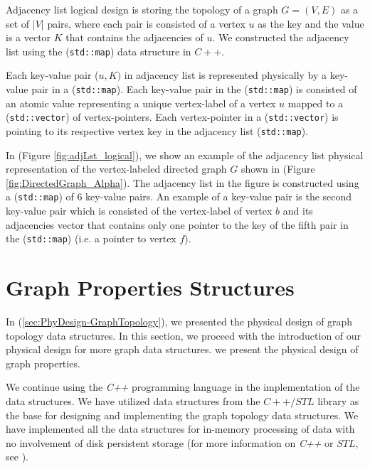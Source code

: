 {Adjacency list logical design is storing the topology of a graph $G = (V,E)$ as a set of |$V$| pairs, where each pair is consisted of a vertex $u$ as the key and the value is a vector $K$ that contains the adjacencies of $u$. We constructed the adjacency list using the (\texttt{std::map}) data structure in $C++$.

Each key-value pair ($u,K)$ in adjacency list is represented physically by a key-value pair in a (\texttt{std::map}). Each key-value pair in the (\texttt{std::map}) is consisted of an atomic value representing a unique vertex-label of a vertex $u$ mapped to a (\texttt{std::vector}) of vertex-pointers. Each vertex-pointer in a (\texttt{std::vector}) is pointing to its respective vertex key in the adjacency list (\texttt{std::map}).


In (Figure \ref{fig:adjLst_logical}), we show an example of the adjacency list physical representation of the vertex-labeled directed graph $G$ shown in (Figure \ref{fig:DirectedGraph_Alpha}). The adjacency list in the figure is constructed using a (\texttt{std::map}) of 6 key-value pairs. An example of a key-value pair is the second key-value pair which is consisted of the vertex-label of vertex $b$ and its adjacencies vector that contains only one pointer to the key of the fifth pair in the (\texttt{std::map}) (i.e. a pointer to vertex $f$).

\section{Graph Properties Structures}
\label{sec:PhyDesign-GraphProperties}

In (\ref{sec:PhyDesign-GraphTopology}), we presented the physical design of graph topology data structures. In this section, we proceed with the introduction of our physical design for more graph data structures. we present the physical design of graph properties.

We continue using the \textit{C++} programming language in the implementation of the data structures. We have utilized data structures from the $C++/STL$ library as the base for designing and implementing the graph topology data structures. We have implemented all the data structures for in-memory processing of data with no involvement of disk persistent storage (for more information on \textit{C++} or $STL$, see \cite{josuttis2012c++}).

}
